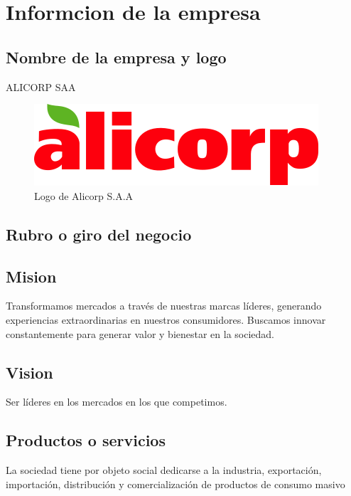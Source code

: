 \section{Informcion de la empresa}

\subsection{Nombre de la empresa y logo}
ALICORP SAA\\
\begin{figure}[!ht]
    \centering
    \includegraphics[scale = 0.6]{./figuras/logo_alicorp.png}	 
    \caption{Logo de Alicorp S.A.A}
\label{fig:logo}
\end{figure}


\subsection{Rubro o giro del negocio}

\subsection{Mision}
Transformamos mercados a través de nuestras marcas líderes, generando experiencias extraordinarias en nuestros consumidores. Buscamos innovar constantemente para generar valor y bienestar en la sociedad.

\subsection{Vision}
Ser líderes en los mercados en los que competimos.
\subsection{Productos o servicios}
La sociedad tiene por objeto social dedicarse a la industria, exportación, importación, distribución y comercialización de productos de consumo masivo

